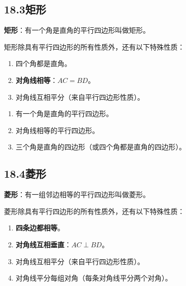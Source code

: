\documentclass[12pt, a4paper]{ctexart}
\begin{document}
\subsection*{18.3\quad 矩形}

\begin{knowledgebox}[矩形的定义和性质]
\textbf{矩形}：有一个角是直角的平行四边形叫做矩形。

矩形除具有平行四边形的所有性质外，还有以下特殊性质：
\begin{enumerate}[label=\arabic*.]
  \item 四个角都是直角。
  \item \textbf{对角线相等}：$AC = BD$。
  \item 对角线互相平分（来自平行四边形性质）。
\end{enumerate}
\end{knowledgebox}

\begin{knowledgebox}[矩形的判定]
\begin{enumerate}[label=\textbf{方法\arabic*：}]
  \item 有一个角是直角的平行四边形。
  \item 对角线相等的平行四边形。
  \item 三个角是直角的四边形（或四个角都是直角的四边形）。
\end{enumerate}
\end{knowledgebox}

\begin{center}
\end{center}

\subsection*{18.4\quad 菱形}

\begin{knowledgebox}[菱形的定义和性质]
\textbf{菱形}：有一组邻边相等的平行四边形叫做菱形。

菱形除具有平行四边形的所有性质外，还有以下特殊性质：
\begin{enumerate}[label=\arabic*.]
  \item \textbf{四条边都相等}。
  \item \textbf{对角线互相垂直}：$AC \perp BD$。
  \item 对角线互相平分（来自平行四边形性质）。
  \item 对角线平分每组对角（每条对角线平分两个对角）。
\end{enumerate}
\end{knowledgebox}
\end{document}
